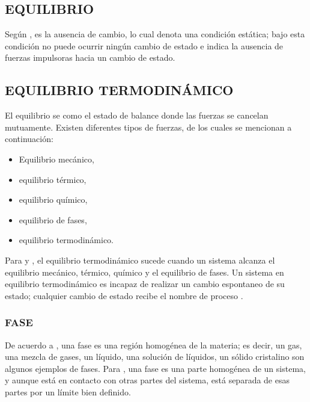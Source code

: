 

\subsection{EQUILIBRIO}
Según \parencite[p. 29]{Smith.VanNess.Abbott2007}, es la ausencia de cambio, lo cual denota una condición estática; bajo esta condición no puede ocurrir ningún cambio de estado e indica la ausencia de fuerzas impulsoras hacia un cambio de estado.

\subsection{EQUILIBRIO TERMODINÁMICO}
El equilibrio se como el estado de balance donde las fuerzas se cancelan mutuamente. Existen diferentes tipos de fuerzas, de los cuales se mencionan a continuación:
\begin{itemize}
  \item Equilibrio mecánico,
  \item equilibrio térmico,
  \item equilibrio químico,
  \item equilibrio de fases,
  \item equilibrio termodinámico.
\end{itemize}

Para \parencite{Reisel2021} y \parencite{YunusA.Cengel2015}, el equilibrio termodinámico sucede cuando un sistema alcanza el equilibrio mecánico, térmico, químico y el equilibrio de fases.
Un sistema en equilibrio termodinámico es incapaz de realizar un cambio espontaneo de su estado; cualquier cambio de estado recibe el nombre de proceso \parencite[p. 39]{YunusA.Cengel2015}.




\subsubsection{FASE}
    De acuerdo a \parencite[p. 30]{Smith.VanNess.Abbott2007}, una fase es una región homogénea de la materia; es decir, un gas, una mezcla de gases, un líquido, una solución de líquidos, un sólido cristalino son algunos ejemplos de fases. Para \parencite[p. 461]{ChangQmc2010}, una fase es una parte homogénea de un sistema, y aunque está en contacto con otras partes del sistema, está separada de esas partes por un límite bien definido.
    
